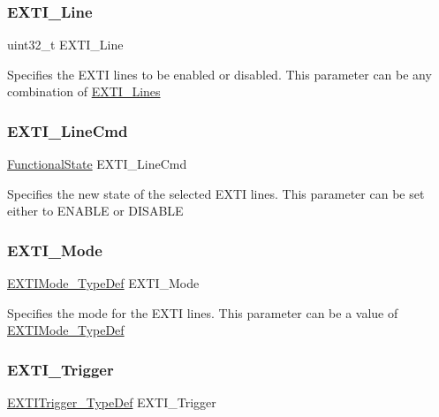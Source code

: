 \subsubsection{\texorpdfstring{EXTI\_Line}{EXTI\_Line}}
{\footnotesize\ttfamily uint32\+\_\+t E\+X\+T\+I\+\_\+\+Line}

Specifies the E\+X\+TI lines to be enabled or disabled. This parameter can be any combination of \mbox{\hyperlink{group___e_x_t_i___lines}{E\+X\+T\+I\+\_\+\+Lines}} \mbox{\label{struct_e_x_t_i___init_type_def_a5a4f12d56819fcfdd25f973adbbca045}} 
\subsubsection{\texorpdfstring{EXTI\_LineCmd}{EXTI\_LineCmd}}
{\footnotesize\ttfamily \mbox{\hyperlink{group___exported__types_gac9a7e9a35d2513ec15c3b537aaa4fba1}{Functional\+State}} E\+X\+T\+I\+\_\+\+Line\+Cmd}

Specifies the new state of the selected E\+X\+TI lines. This parameter can be set either to E\+N\+A\+B\+LE or D\+I\+S\+A\+B\+LE \mbox{\label{struct_e_x_t_i___init_type_def_abea50256cdb09a2a84fc8f104611b867}} 
\subsubsection{\texorpdfstring{EXTI\_Mode}{EXTI\_Mode}}
{\footnotesize\ttfamily \mbox{\hyperlink{group___e_x_t_i___exported___types_gad5e69af98dc0dfdf64417adc1cf57929}{E\+X\+T\+I\+Mode\+\_\+\+Type\+Def}} E\+X\+T\+I\+\_\+\+Mode}

Specifies the mode for the E\+X\+TI lines. This parameter can be a value of \mbox{\hyperlink{group___e_x_t_i___exported___types_gad5e69af98dc0dfdf64417adc1cf57929}{E\+X\+T\+I\+Mode\+\_\+\+Type\+Def}} \mbox{\label{struct_e_x_t_i___init_type_def_ab60cf7701e280ca910eff8c618590ec5}} 
\subsubsection{\texorpdfstring{EXTI\_Trigger}{EXTI\_Trigger}}
{\footnotesize\ttfamily \mbox{\hyperlink{group___e_x_t_i___exported___types_ga9da190f5425d1b421a06bced8cc48e9b}{E\+X\+T\+I\+Trigger\+\_\+\+Type\+Def}} E\+X\+T\+I\+\_\+\+Trigger}

